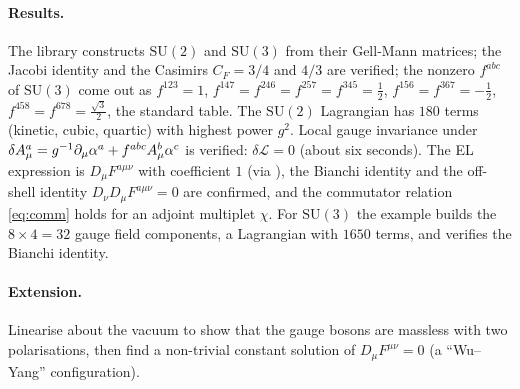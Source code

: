 \paragraph{Results.} The library constructs $\mathrm{SU}(2)$ and $\mathrm{SU}(3)$ from their Gell-Mann matrices; the Jacobi identity and the Casimirs $C_F=3/4$ and $4/3$ are verified; the nonzero $f^{abc}$ of $\mathrm{SU}(3)$ come out as $f^{123}=1$, $f^{147}=f^{246}=f^{257}=f^{345}=\tfrac12$, $f^{156}=f^{367}=-\tfrac12$, $f^{458}=f^{678}=\tfrac{\sqrt3}2$, the standard table. The $\mathrm{SU}(2)$ Lagrangian has $180$ terms (kinetic, cubic, quartic) with highest power $g^2$. Local gauge invariance under $\delta A^a_\mu=g^{-1}\partial_\mu\alpha^a+f^{abc}A^b_\mu\alpha^c$ is verified: $\delta\mathcal L=0$ (about six seconds). The EL expression is $D_\mu F^{a\mu\nu}$ with coefficient $1$ (via ), the Bianchi identity and the off-shell identity $D_\nu D_\mu F^{a\mu\nu}=0$ are confirmed, and the commutator relation \cref{eq:comm} holds for an adjoint multiplet $\chi$. For $\mathrm{SU}(3)$ the example builds the $8\times4=32$ gauge field components, a Lagrangian with $1650$ terms, and verifies the Bianchi identity.

\paragraph{Extension.} Linearise about the vacuum to show that the gauge bosons are massless with two polarisations, then find a non-trivial constant solution of $D_\mu F^{\mu\nu}=0$ (a ``Wu--Yang'' configuration).


